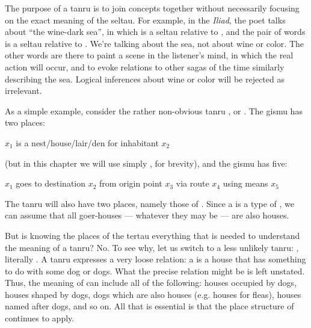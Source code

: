 The purpose of a tanru is to join concepts together without
    necessarily focusing on the exact meaning of the seltau. For
    example, in the \textit{Iliad}, the poet talks about ``the
    wine-dark sea'', in which  is a seltau relative to
    , and the pair of words is a seltau relative to
    . We're talking about the sea, not about wine or color.
    The other words are there to paint a scene in the listener's
    mind, in which the real action will occur, and to evoke
    relations to other sagas of the time similarly describing the
    sea. Logical inferences about wine or color will be rejected as
    irrelevant.

As a simple example, consider the rather non-obvious tanru
    , or . The gismu  has two
    places:
\begin{example}
$x_1$ is a nest/house/lair/den for inhabitant $x_2$
\end{example}

(but in this chapter we will use simply , for
    brevity), and the gismu  has five:
\begin{example}
$x_1$ goes to destination $x_2$ from origin point $x_3$\n
\T	via route $x_4$ using means $x_5$
\end{example}

The tanru  will also have two places, namely
    those of . Since a  is a type of
    , we can assume that all goer-houses --- whatever they
    may be --- are also houses.

But is knowing the places of the tertau everything that is
    needed to understand the meaning of a tanru? No. To see why,
    let us switch to a less unlikely tanru: ,
    literally . A tanru expresses a very loose
    relation: a  is a house that has something to do
    with some dog or dogs. What the precise relation might be is
    left unstated. Thus, the meaning of  can
    include all of the following: houses occupied by dogs, houses
    shaped by dogs, dogs which are also houses (e.g. houses for
    fleas), houses named after dogs, and so on. All that is
    essential is that the place structure of  continues to
    apply.


